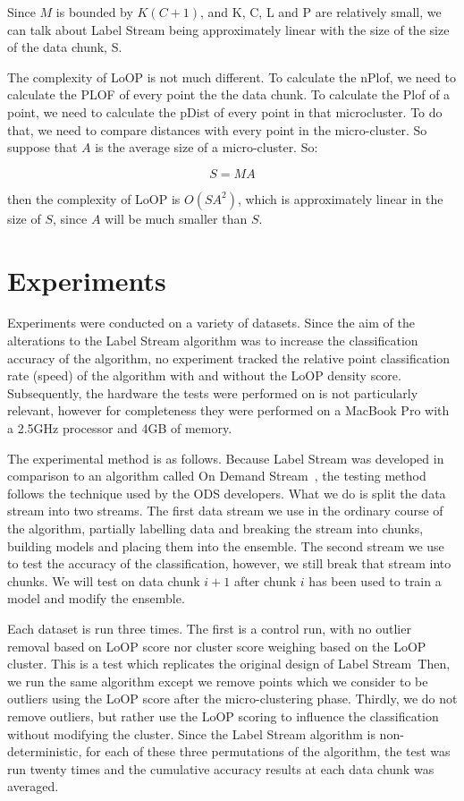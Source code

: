 \documentclass[12pt,a4paper,oneside]{report}
\begin{document}
Since $M$ is bounded by $K(C+1)$, and K, C, L and P are relatively small, we can talk about Label Stream being approximately linear with the size of the size of the data chunk, S. 

The complexity of LoOP is not much different. To calculate the nPlof, we need to calculate the PLOF of every point the the data chunk.  To calculate the Plof of a point, we need to calculate the pDist of every point in that microcluster. To do that, we need to compare distances with every point in the micro-cluster. So suppose that $A$ is the average size of a micro-cluster. So:

\[S = MA\]

then the complexity of LoOP is $O(SA^2)$, which is approximately linear in the size of $S$, since $A$ will be much smaller than $S$.

\section*{Experiments}
Experiments were conducted on a variety of datasets. Since the aim of the alterations to the Label Stream algorithm was to increase the classification accuracy of the algorithm, no experiment tracked the relative point classification rate (speed) of the algorithm with and without the LoOP density score. Subsequently, the hardware the tests were performed on is not particularly relevant, however for completeness they were performed on a MacBook Pro with a 2.5GHz processor and 4GB of memory. 

The experimental method is as follows. Because Label Stream was developed in comparison to an algorithm called On Demand Stream~\cite{ODS}, the testing method follows the technique used by the ODS developers. What we do is split the data stream into two streams. The first data stream we use in the ordinary course of the algorithm, partially labelling data and breaking the stream into chunks, building models and placing them into the ensemble. The second stream we use to test the accuracy of the classification, however, we still break that stream into chunks. We will test on data chunk $i+1$ after chunk $i$ has been used to train a model and modify the ensemble.

Each dataset is run three times. The first is a control run, with no outlier removal based on LoOP score nor cluster score weighing based on the LoOP cluster. This is a test which replicates the original design of Label Stream~\cite{LabStr}Then, we run the same algorithm except we remove points which we consider to be outliers using the LoOP score after the micro-clustering phase. Thirdly, we do not remove outliers, but rather use the LoOP scoring to influence the classification without modifying the cluster. Since the Label Stream algorithm is non-deterministic, for each of these three permutations of the algorithm, the test was run twenty times and the cumulative accuracy results at each data chunk was averaged. 
\end{document}
